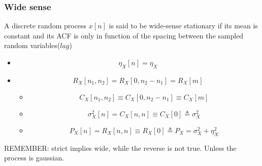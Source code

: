 \subsubsection{Wide sense}
A discrete random process \(x[n]\) is said to be wide-sense stationary if its mean is constant and its ACF is only in function of the spacing between the sampled random variables(\(lag\))
\begin{itemize}
    \item \[\eta_X[n]=\eta_X\]
    \item \[R_X[n_1,n_2]=R_X[0,n_2-n_1]=R_X[m]\]
    \begin{itemize}
        \item \[
C_X[n_1, n_2] \equiv C_X[0, n_2 - n_1] \equiv C_X[m]
\]
\item 
\[
\sigma_X^2[n] = C_X[n, n] \equiv C_X[0] \triangleq \sigma_X^2
\]
\item 
\[
P_X[n] = R_X[n, n] \equiv R_X[0] \triangleq P_X = \sigma_X^2 + \eta_X^2
\]
    \end{itemize}
\end{itemize}
REMEMBER: strict implies wide, while the reverse is not true. Unless the process is gaussian.
